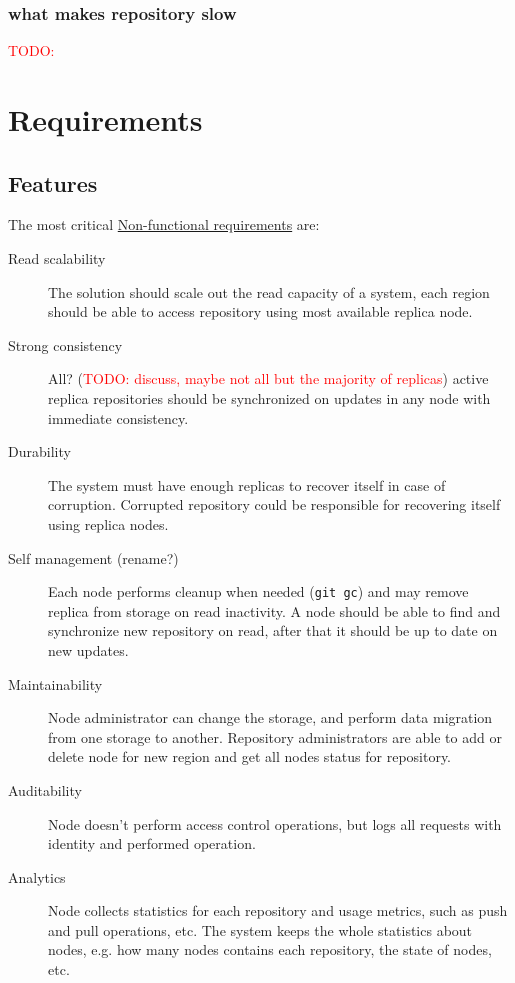 \documentclass[12pt,oneside]{article}
\newcommand{\code}[1]{\texttt{#1}}
\newcommand{\todo}[1]{\textcolor{red}{TODO: #1}}
\begin{document}
\subsubsection{what makes repository slow}

\todo{}

\section{Requirements}
\label{sec:requirements}

\subsection{Features}
\label{sec:features}

The most critical
\href{https://en.wikipedia.org/wiki/Non-functional_requirement}{Non-functional requirements}
are:

\begin{description}
  \item[Read scalability]
    The solution should scale out the read capacity of a system, each region should be able
    to access repository using most available replica node.
  \item[Strong consistency]
    All? (\todo{discuss, maybe not all but the majority of replicas})
    active replica repositories should be synchronized on updates in any node
    with immediate consistency.
  \item[Durability]
    The system must have enough replicas to recover itself in case of corruption.
    Corrupted repository could be responsible for recovering itself using replica nodes.
  \item[Self management (rename?)]
    Each node performs cleanup when needed (\code{git gc}) and may remove replica
    from storage on read inactivity.
    A node should be able to find and synchronize new repository on read,
    after that it should be up to date on new updates.
  \item[Maintainability]
    Node administrator can change the storage, and perform data migration from one storage
    to another.
    Repository administrators are able to add or delete node for new region and
    get all nodes status for repository.
  \item[Auditability]
    Node doesn't perform access control operations, but logs all
    requests with identity and performed operation.
  \item[Analytics]
    Node collects statistics for each repository and usage metrics, such as
    push and pull operations, etc. The system keeps the whole statistics about
    nodes, e.g. how many nodes contains each repository, the state of nodes, etc.
\end{description}
\end{document}
